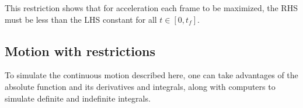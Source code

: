 This restriction shows that for acceleration each frame to be maximized, the RHS must be less than the LHS constant for all $t \in [0, t_f]$.

\subsection{Motion with restrictions}
To simulate the continuous motion described here, one can take advantages of the absolute function and its derivatives and integrals, along with computers to simulate definite and indefinite integrals.

